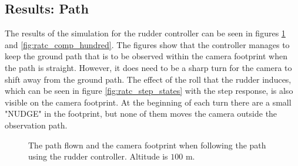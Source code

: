 \subsection{Results: Path}

The results of the simulation for the rudder controller can be seen in figures \ref{fig:ratc_path_hundred} and \ref{fig:ratc_comp_hundred}. The figures show that the controller manages to keep the ground path that is to be observed within the camera footprint when the path is straight. However, it does need to be a sharp turn for the camera to shift away from the ground path. The effect of the roll that the rudder induces, which can be seen in figure \ref{fig:ratc_step_states} with the step response, is also visible on the camera footprint. At the beginning of each turn there are a small "NUDGE" in the footprint, but none of them moves the camera outside the observation path.

\begin{figure}[]
    \centering
    \caption{The path flown and the camera footprint when following the path using the rudder controller. Altitude is $100$ m.}
	\label{fig:ratc_path_hundred}
\end{figure}

